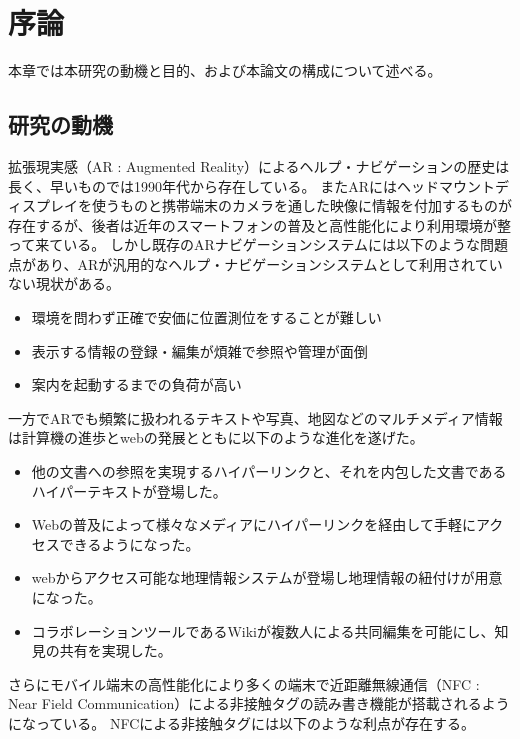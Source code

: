 \chapter{序論}
\label{chap:introduction}


本章では本研究の動機と目的、および本論文の構成について述べる。

\newpage


\section{研究の動機}
\label{motive}

拡張現実感（AR : Augmented Reality）によるヘルプ・ナビゲーションの歴史は長く、早いものでは1990年代から存在している。
またARにはヘッドマウントディスプレイを使うものと携帯端末のカメラを通した映像に情報を付加するものが存在するが、後者は近年のスマートフォンの普及と高性能化により利用環境が整って来ている。
しかし既存のARナビゲーションシステムには以下のような問題点があり、ARが汎用的なヘルプ・ナビゲーションシステムとして利用されていない現状がある。

\begin{itemize}
  \item 環境を問わず正確で安価に位置測位をすることが難しい
  \item 表示する情報の登録・編集が煩雑で参照や管理が面倒
  \item 案内を起動するまでの負荷が高い
\end{itemize}

一方でARでも頻繁に扱われるテキストや写真、地図などのマルチメディア情報は計算機の進歩とwebの発展とともに以下のような進化を遂げた。

\begin{itemize}
  \item 他の文書への参照を実現するハイパーリンクと、それを内包した文書であるハイパーテキストが登場した。
  \item Webの普及によって様々なメディアにハイパーリンクを経由して手軽にアクセスできるようになった。
  \item webからアクセス可能な地理情報システムが登場し地理情報の紐付けが用意になった。
  \item コラボレーションツールであるWikiが複数人による共同編集を可能にし、知見の共有を実現した。
\end{itemize}

さらにモバイル端末の高性能化により多くの端末で近距離無線通信（NFC : Near Field Communication）による非接触タグの読み書き機能が搭載されるようになっている。
NFCによる非接触タグには以下のような利点が存在する。

